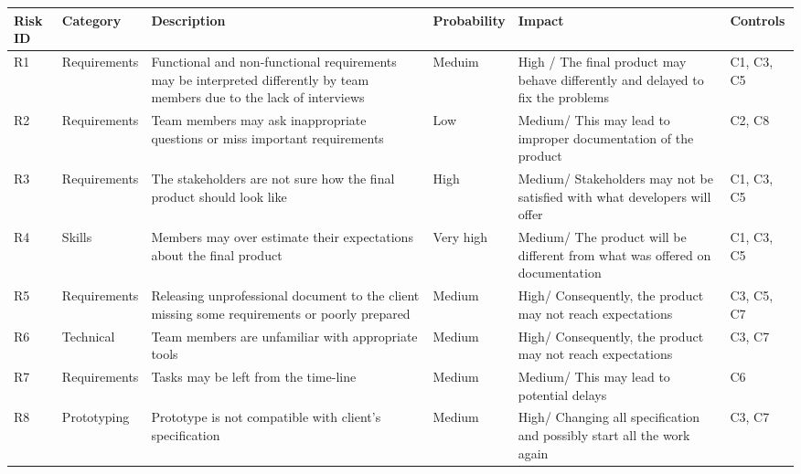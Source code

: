 \documentclass{l3deliverable}
\begin{document}
{\begin{center}{
\begin{tabular}{|p{2cm}|p{2cm}|p{3cm}|p{2cm}|p{3cm}|p{2cm}|}
\hline \textbf{Risk ID} &\textbf{Category} & \textbf{Description} & \textbf{Probability} & \textbf{Impact} & \textbf{Controls}\\
\hline R1 & Requirements & Functional and non-functional requirements may be interpreted differently by team members due to the lack of interviews & Meduim & High / The final product may behave differently and delayed to fix the problems & C1, C3, C5\\
\hline R2 & Requirements & Team members may ask inappropriate questions or miss important requirements & Low & Medium/ This may lead to improper documentation of the product & C2, C8\\
\hline R3 & Requirements & The stakeholders are not sure how the final product should look like & High & Medium/ Stakeholders may not be satisfied with what developers will offer & C1, C3, C5\\
\hline R4 & Skills & Members may over estimate their expectations about the final product & Very high & Medium/ The product will be different from what was offered on documentation & C1, C3, C5\\
\hline R5 & Requirements & Releasing unprofessional document to the client missing some requirements or poorly prepared & Medium & High/ Consequently, the product may not reach expectations & C3, C5, C7\\
\hline R6 & Technical & Team members are unfamiliar with appropriate tools & Medium & High/ Consequently, the product may not reach expectations & C3, C7\\
\hline R7 & Requirements & Tasks may be left from the time-line & Medium & Medium/ This may lead to potential delays & C6\\
\hline R8 & Prototyping & Prototype is not compatible with client's specification & Medium & High/ Changing all specification and possibly start all the work again & C3, C7\\
\hline
\end{tabular} }
\end{center}

}
\end{document}
